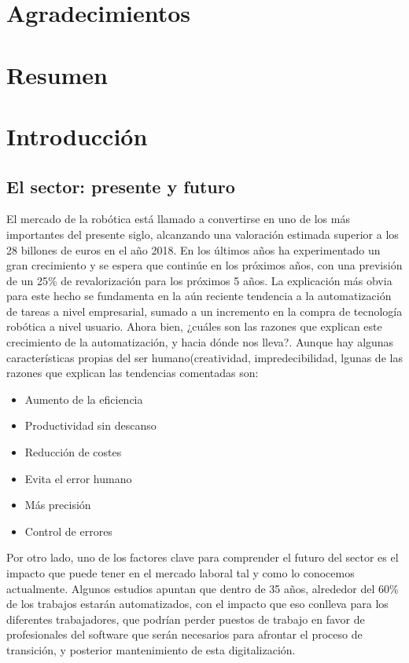 \documentclass[12pt,spanish,chapterprefix, numbers=noenddot]{book}
\numberwithin{equation}{section}
\numberwithin{figure}{section}
\begin{document}
\chapter*{Agradecimientos}

\chapter*{Resumen}

\tableofcontents{}

\mainmatter

\chapter{Introducción}

\section{El sector: presente y futuro}
El mercado de la robótica está llamado a convertirse en uno de los más importantes del presente siglo, alcanzando una valoración estimada superior a los 28 billones de euros en el año 2018. En los últimos años ha experimentado un gran crecimiento y se espera que continúe en los próximos años, con una previsión de un 25\% de revalorización para los próximos 5 años. 
La explicación más obvia para este hecho se fundamenta en la aún reciente tendencia a la automatización de tareas a nivel empresarial, sumado a un incremento en la compra de tecnología robótica a nivel usuario.
Ahora bien, ¿cuáles son las razones que explican este crecimiento de la automatización, y hacia dónde nos lleva?. Aunque hay algunas características propias del ser humano(creatividad, impredecibilidad, lgunas de las razones que explican las tendencias comentadas son:
\begin{itemize}
\item Aumento de la eficiencia 
\item Productividad sin descanso
\item Reducción de costes
\item Evita el error humano
\item Más precisión
\item Control de errores
\end{itemize}
Por otro lado, uno de los factores clave para comprender el futuro del sector es el impacto que puede tener en el mercado laboral tal y como lo conocemos actualmente. Algunos estudios apuntan que dentro de 35 años, alrededor del 60\% de los trabajos estarán automatizados, con el impacto que eso conlleva para los diferentes trabajadores, que podrían perder puestos de trabajo en favor de profesionales del software que serán necesarios para afrontar el proceso de transición, y posterior mantenimiento de esta digitalización. 
\end{document}
